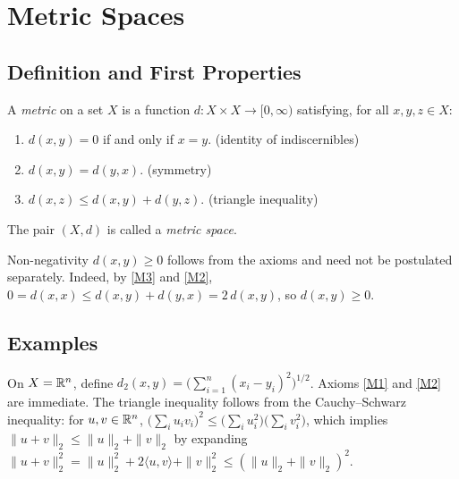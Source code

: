 \documentclass[11pt,a4paper]{article}
\begin{document}

\section{Metric Spaces}
\label{sec:metric}

\subsection{Definition and First Properties}
\label{subsec:metric_def}

\begin{definition}
\label{def:metric}
A \emph{metric} on a set $X$ is a function $d \colon X \times X \to [0,\infty)$
satisfying, for all $x, y, z \in X$:
\begin{enumerate}[nosep,label=(M\arabic*)]
  \item \label{M1} $d(x,y) = 0$ if and only if $x = y$.
    \hfill (identity of indiscernibles)
  \item \label{M2} $d(x,y) = d(y,x)$.
    \hfill (symmetry)
  \item \label{M3} $d(x,z) \le d(x,y) + d(y,z)$.
    \hfill (triangle inequality)
\end{enumerate}
The pair $(X,d)$ is called a \emph{metric space}.
\end{definition}

\begin{remark}
\label{rem:nonneg}
Non-negativity $d(x,y) \ge 0$ follows from the axioms and need not be
postulated separately. Indeed, by \ref{M3} and \ref{M2},
$0 = d(x,x) \le d(x,y) + d(y,x) = 2\,d(x,y)$, so $d(x,y) \ge 0$.
\end{remark}

\subsection{Examples}
\label{subsec:examples}

\begin{example}
\label{ex:euclidean}
On $X = \mathbb{R}^n$, define
$d_2(x,y) = \bigl(\sum_{i=1}^n (x_i - y_i)^2\bigr)^{1/2}$.
Axioms \ref{M1} and \ref{M2} are immediate. The triangle inequality follows
from the Cauchy--Schwarz inequality: for $u, v \in \mathbb{R}^n$,
$\bigl(\sum_i u_i v_i\bigr)^2 \le \bigl(\sum_i u_i^2\bigr)
\bigl(\sum_i v_i^2\bigr)$, which implies
$\|u + v\|_2 \le \|u\|_2 + \|v\|_2$ by expanding
$\|u+v\|_2^2 = \|u\|_2^2 + 2\langle u,v\rangle + \|v\|_2^2
\le (\|u\|_2 + \|v\|_2)^2$.
\end{example}
\end{document}
